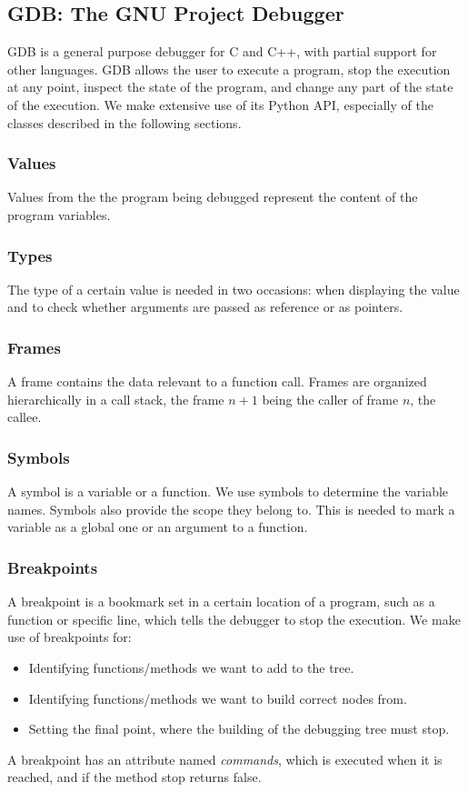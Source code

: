 \subsection{GDB: The GNU Project Debugger}
GDB \cite{gdb} is a general purpose debugger for C and C++, with partial support for other languages. GDB allows the user to execute a program, stop the execution at any point, inspect the state of the program, and change any part of the state of the execution.
%
We make extensive use of its Python API, especially of the classes described in the following sections.

\subsubsection{Values}
Values from the the program being debugged represent the content of the program variables.
\subsubsection{Types}
The type of a certain value is needed in two occasions: when displaying the value and to check whether arguments are passed as reference or as pointers.
\subsubsection{Frames}
A frame contains the data relevant to a function call.
Frames are organized hierarchically in a call stack, the frame \(n+1\) being the caller of frame \(n\), the callee.
\subsubsection{Symbols}
A symbol is a variable or a function. We use symbols to determine the variable names. Symbols also provide the scope they belong to. This is needed to mark a variable as a global one or an argument to a function. 
\subsubsection{Breakpoints}
A breakpoint is a bookmark set in a certain location of a program, such as a function or specific line, which tells the debugger to stop the execution.
We make use of breakpoints for:
\begin{itemize}
    \item Identifying functions/methods we want to add to the tree.
    \item Identifying functions/methods we want to build correct nodes from.
    \item Setting the final point, where the building of the debugging tree must stop.
\end{itemize}
A breakpoint has an attribute named \emph{commands}, which is executed when it is reached, and if the method stop returns false.

